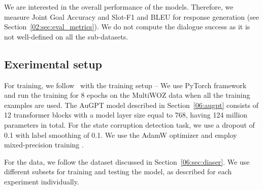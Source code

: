 We are interested in the overall performance of the models.
Therefore, we measure Joint Goal Accuracy and Slot-F1 and BLEU for response generation (see Section~\ref{02:sec:eval_metrics}).
We do not compute the dialogue success as it is not well-defined on all the sub-datasets.

\subsection{Exerimental setup}
For training, we follow~\citep{kulhanek-etal-2021-augpt} with the training setup --
We use PyTorch framework \cite{pytorch} and run the training for 8 epochs on the MultiWOZ data when all the training examples are used.
The AuGPT model described in Section~\ref{06:augpt} consists of 12 transformer blocks with a model layer size equal to 768, having 124 million parameters in total.
For the state corruption detection task, we use a dropout of 0.1 with label smoothing of 0.1.
We use the AdamW optimizer \cite{DBLP:conf/iclr/LoshchilovH19} and employ mixed-precision training \cite{micikevicius2017mixed}.

For the data, we follow the dataset discussed in Section~\ref{06:sec:diaser}.
We use different subsets for training and testing the model, as described for each experiment individually.


